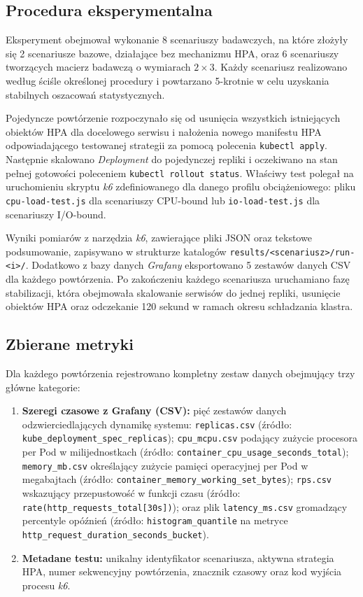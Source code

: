 \subsection{Procedura eksperymentalna}

Eksperyment obejmował wykonanie 8 scenariuszy badawczych, na które złożyły się 2 scenariusze bazowe, działające bez mechanizmu HPA, oraz 6 scenariuszy tworzących macierz badawczą o wymiarach $2 \times 3$. Każdy scenariusz realizowano według ściśle określonej procedury i powtarzano 5-krotnie w celu uzyskania stabilnych oszacowań statystycznych.

Pojedyncze powtórzenie rozpoczynało się od usunięcia wszystkich istniejących obiektów HPA dla docelowego serwisu i nałożenia nowego manifestu HPA odpowiadającego testowanej strategii za pomocą polecenia \texttt{kubectl apply}. Następnie skalowano \textit{Deployment} do pojedynczej repliki i oczekiwano na stan pełnej gotowości poleceniem \texttt{kubectl rollout status}. Właściwy test polegał na uruchomieniu skryptu \textit{k6} zdefiniowanego dla danego profilu obciążeniowego: pliku \texttt{cpu-load-test.js} dla scenariuszy CPU-bound lub \texttt{io-load-test.js} dla scenariuszy I/O-bound. 

Wyniki pomiarów z narzędzia \textit{k6}, zawierające pliki JSON oraz tekstowe podsumowanie, zapisywano w strukturze katalogów \texttt{results/<scenariusz>/run-<i>/}. Dodatkowo z bazy danych \textit{Grafany} eksportowano 5 zestawów danych CSV dla każdego powtórzenia. Po zakończeniu każdego scenariusza uruchamiano fazę stabilizacji, która obejmowała skalowanie serwisów do jednej repliki, usunięcie obiektów HPA oraz odczekanie 120 sekund w ramach okresu schładzania klastra.

\subsection{Zbierane metryki}

Dla każdego powtórzenia rejestrowano kompletny zestaw danych obejmujący trzy główne kategorie:
\begin{enumerate}
  \item \textbf{Szeregi czasowe z Grafany (CSV):} pięć zestawów danych odzwierciedlających dynamikę systemu: \texttt{replicas.csv} (źródło: \texttt{kube\_deployment\_spec\_replicas}); \texttt{cpu\_mcpu.csv} podający zużycie procesora per Pod w milijednostkach (źródło: \texttt{container\_cpu\_usage\_seconds\_total}); \texttt{memory\_mb.csv} określający zużycie pamięci operacyjnej per Pod w megabajtach (źródło: \texttt{container\_memory\_working\_set\_bytes}); \texttt{rps.csv} wskazujący przepustowość w funkcji czasu (źródło: \texttt{rate(http\_requests\_total[30s])}); oraz plik \texttt{latency\_ms.csv} gromadzący percentyle opóźnień (źródło: \texttt{histogram\_quantile} na metryce \texttt{http\_request\_duration\_seconds\_bucket}).
  \item \textbf{Metadane testu:} unikalny identyfikator scenariusza, aktywna strategia HPA, numer sekwencyjny powtórzenia, znacznik czasowy oraz kod wyjścia procesu \textit{k6}.
\end{enumerate}

